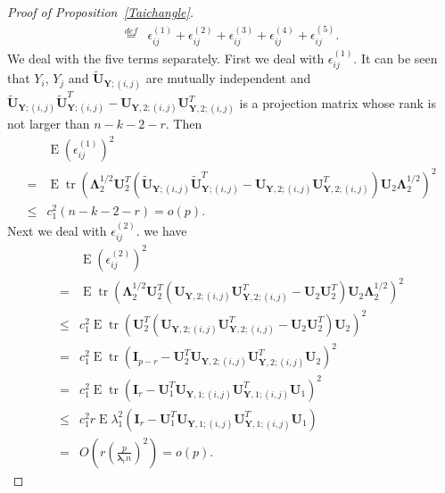 \documentclass[12pt]{article} %
\DeclareMathOperator{\mytr}{tr}
\DeclareMathOperator{\myE}{E}
\newcommand{\bY}{\mathbf{Y}}
\newcommand{\bI}{\mathbf{I}}
\newcommand{\bU}{\mathbf{U}}
\newcommand{\bfsym}[1]{\ensuremath{\boldsymbol{#1}}}
\def\blambda {\bfsym {\lambda}}
\def\bLambda {\bfsym {\Lambda}}
\theoremstyle{definition}
\begin{document}
\begin{appendices}
\begin{proof}[Proof of Proposition~\ref{Taichangle}]
\begin{equation}
\begin{aligned}
        \overset{def}{=} &
        \epsilon_{ij}^{(1)}+
        \epsilon_{ij}^{(2)}+
        \epsilon_{ij}^{(3)}+
        \epsilon_{ij}^{(4)}+
        \epsilon_{ij}^{(5)}.
    \end{aligned}
    \end{equation}
        We deal with the five terms separately.
        First we deal with $\epsilon_{ij}^{(1)}$.
        It can be seen that
         $Y_i$, $Y_j$ and $\tilde{\bU}_{\bY;(i,j)}$ are mutually independent and
        $\tilde{\bU}_{\bY;(i,j)} \tilde{\bU}_{\bY;(i,j)}^T-\bU_{\bY,2;(i,j)} \bU_{\bY,2;(i,j)}^T$ is a projection matrix whose rank is not larger than $n-k-2-r$.
        Then
        $$
        \begin{aligned}
            &\myE (\epsilon_{ij}^{(1)})^2\\
            =&\myE \mytr (\bLambda_2^{1/2}\bU_2^T(\tilde{\bU}_{\bY;(i,j)} \tilde{\bU}_{\bY;(i,j)}^T-\bU_{\bY,2;(i,j)} \bU_{\bY,2;(i,j)}^T)\bU_2 \bLambda_2^{1/2})^2\\
            \leq & c_1^2 (n-k-2-r)=o(p).
        \end{aligned}
        $$
        Next we deal with $\epsilon_{ij}^{(2)}$. we have
        $$
        \begin{aligned}
            &\myE (\epsilon_{ij}^{(2)})^2\\
            =&\myE \mytr (\bLambda_2^{1/2}\bU_2^T(
            \bU_{\bY,2;(i,j)} \bU_{\bY,2;(i,j)}^T-\bU_2\bU_2^T
            )\bU_2 \bLambda_2^{1/2})^2\\
            \leq & c_1^2 
            \myE \mytr (\bU_2^T(
            \bU_{\bY,2;(i,j)} \bU_{\bY,2;(i,j)}^T-\bU_2\bU_2^T
            )\bU_2 )^2\\
            = & c_1^2 
            \myE \mytr (
            \bI_{p-r}-\bU_2^T \bU_{\bY,2;(i,j)} \bU_{\bY,2;(i,j)}^T\bU_2
             )^2\\
            = & c_1^2
        \myE \mytr (\bI_r-\bU_1^T \bU_{\bY,1;(i,j)}\bU_{\bY,1;(i,j)}^T \bU_1)^2\\
            \leq  & c_1^2 r
         \myE \lambda_1^2 (\bI_r-\bU_1^T \bU_{\bY,1;(i,j)}\bU_{\bY,1;(i,j)}^T \bU_1)\\
            =&  O(r (\frac{p}{\blambda_r n})^2)=o(p).
        \end{aligned}
        $$


\end{proof}
\end{appendices}
\end{document}
